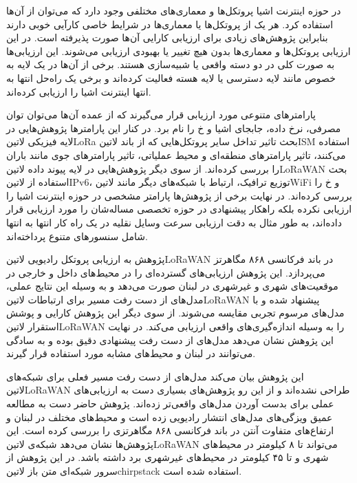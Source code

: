 
در حوزه اینترنت اشیا پروتکل‌ها و معماری‌های مختلفی وجود دارد که می‌توان از آن‌ها استفاده کرد. هر یک از پروتکل‌ها یا معماری‌ها در شرایط خاصی کارآیی خوبی دارند بنابراین پژوهش‌های زیادی برای ارزیابی کارایی آن‌ها صورت پذیرفته است.
در این ارزیابی پروتکل‌ها و معماری‌ها بدون هیچ تغییر یا بهبودی ارزیابی می‌شوند.
این ارزیابی‌ها به صورت کلی در دو دسته واقعی یا شبیه‌سازی هستند. برخی از آن‌ها در یک لایه به خصوص مانند لایه دسترسی یا لایه هسته فعالیت کرده‌اند و برخی یک راه‌حل انتها به انتها اینترنت اشیا را ارزیابی کرده‌اند.

پارامترهای متنوعی مورد ارزیابی قرار می‌گیرند که از عمده آن‌ها می‌توان توان مصرفی، نرخ داده، جابجای اشیا و ‌خ را نام برد.
در کنار این پارامترها پژوهش‌هایی در لایه فیزیکی ‌لاتین{LoRa} بحث تاثیر تداخل سایر پروتکل‌هایی که از باند ‌لاتین{ISM} استفاده می‌کنند، تاثیر پارامترهای منطقه‌ای و محیط عملیاتی، تاثیر پارامتر‌های جوی مانند باران
را بررسی کرده‌اند.
از سوی دیگر پژوهش‌هایی در لایه پیوند داده ‌لاتین{LoRaWAN} بحث استفاده از ‌لاتین{IPv6}، توزیع ترافیک، ارتباط با شبکه‌های دیگر مانند ‌لاتین{WiFi} و ‌خ را بررسی کرده‌اند.
در نهایت برخی از پژوهش‌ها پارامتر مشخصی در حوزه اینترنت اشیا را ارزیابی نکرده بلکه راهکار پیشنهادی در حوزه تخصصی مساله‌شان را مورد ارزیابی قرار داده‌اند، به طور مثال به دقت ارزیابی سرعت
وسایل نقلیه در یک راه کار انتها به انتها شامل سنسورهای متنوع پرداخته‌اند.


پژوهش  به ارزیابی پروتکل رادیویی ‌لاتین{LoRaWAN} در باند فرکانسی ۸۶۸ مگاهرتز می‌پردازد.
این پژوهش ارزیابی‌های گسترده‌ای را در محیط‌های داخل و خارجی در موقعیت‌های شهری و غیرشهری در لبنان صورت می‌دهد
و به وسیله این نتایج عملی، مدل‌های از دست رفت مسیر برای ارتباطات ‌لاتین{LoRaWAN} پیشنهاد شده و با مدل‌های مرسوم تجربی مقایسه می‌شوند.
از سوی دیگر این پژوهش کارایی و پوشش استقرار ‌لاتین{LoRaWAN} را به وسیله اندازه‌گیری‌های واقعی ارزیابی می‌کند.
در نهایت این پژوهش نشان می‌دهد مدل‌های از دست رفت پیشنهادی دقیق بوده و به سادگی می‌توانند در لبنان و محیط‌های مشابه مورد استفاده قرار گیرند.

این پژوهش بیان می‌کند مدل‌های از دست رفت مسیر فعلی برای شبکه‌های ‌لاتین{LoRaWAN} طراحی نشده‌اند و از این رو پژوهش‌های بسیاری دست به ارزیابی‌های عملی
برای بدست آوردن مدل‌های واقعی‌تر زده‌اند. پژوهش حاضر دست به مطالعه عمیق ويزگی‌های مدل‌های انتشار رادیویی زده است و محیط‌های مختلف در لبنان و ارتفاع‌های متفاوت
آنتن در باند فرکانسی ۸۶۸ مگاهرتزی را بررسی کرده است. این پژوهش‌ها نشان می‌دهد شبکه‌ی ‌لاتین{LoRaWAN} می‌تواند تا ۸ کیلومتر در محیط‌های شهری و تا ۴۵ کیلومتر
در محیط‌های غیرشهری برد داشته باشد.
در این پژوهش از سرور شبکه‌ای متن باز ‌لاتین{chirpstack} استفاده شده است.

